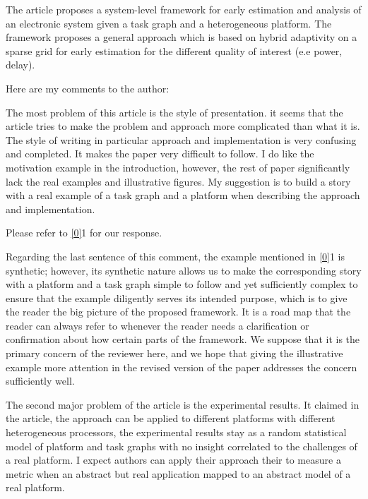 \begin{reviewer}
The article proposes a system-level framework for early estimation and analysis
of an electronic system given a task graph and a heterogeneous platform. The
framework proposes a general approach which is based on hybrid adaptivity on a
sparse grid  for early estimation for the different quality of interest (e.e
power, delay).

Here are my comments to the author:

The most problem of this article is the style of presentation. it seems that the
article tries to make the problem and approach more complicated than what it is.
The style of writing in particular approach and implementation is very confusing
and completed. It makes the paper very difficult to follow. I do like the
motivation example in the introduction, however, the rest of paper significantly
lack the real examples and illustrative figures. My suggestion is to build a
story with a real example of a task graph and a platform when describing the
approach and implementation.
\end{reviewer}

\begin{authors}
Please refer to \cref{0}{1} for our response.

Regarding the last sentence of this comment, the example mentioned in
\cref{0}{1} is synthetic; however, its synthetic nature allows us to make the
corresponding story with a platform and a task graph simple to follow and yet
sufficiently complex to ensure that the example diligently serves its intended
purpose, which is to give the reader the big picture of the proposed framework.
It is a road map that the reader can always refer to whenever the reader needs a
clarification or confirmation about how certain parts of the framework. We
suppose that it is the primary concern of the reviewer here, and we hope that
giving the illustrative example more attention in the revised version of the
paper addresses the concern sufficiently well.

\begin{actions}
\end{actions}
\end{authors}

\begin{reviewer}
The second major problem of the article is the experimental results. It claimed
in the article, the approach can be applied to different platforms with
different heterogeneous processors, the experimental results stay as a random
statistical model of platform and task graphs with no insight correlated to the
challenges of a real platform. I expect authors can apply their approach their
to measure a metric when an abstract but real application mapped to an abstract
model of a real platform.
\end{reviewer}

